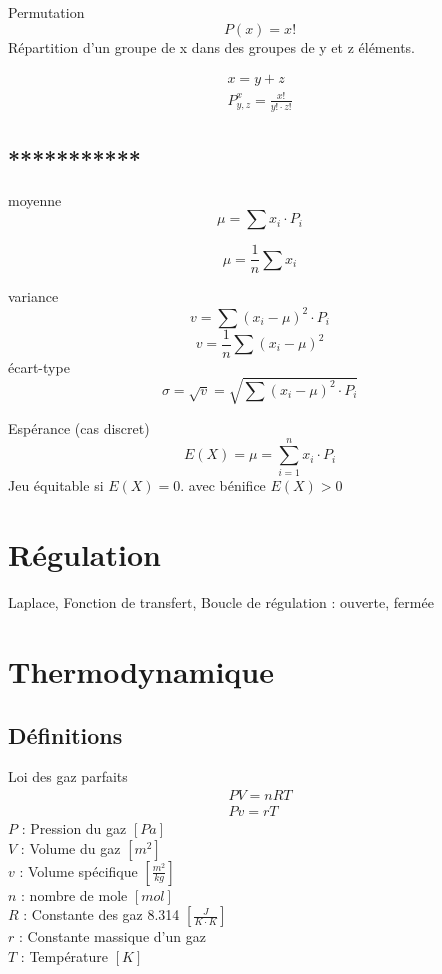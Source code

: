 	
	Permutation
	\begin{equation}
	P(x)=x!
	\end{equation}
	Répartition d'un groupe de x dans des groupes de y et z éléments.
	
	\begin{eqnarray}
	x=y+z\\
	P^x_{y,z}=\frac{x!}{y! \cdot z!}
	\end{eqnarray}
	\subsection{***********}
	
	moyenne
	\begin{equation}
	\mu=\sum x_i \cdot P_i
	\end{equation}
	
	\begin{equation}
	\mu = \frac{1}{n}\sum x_i
	\end{equation}
	
	variance
	\begin{equation}
	v=\sum (x_i-\mu)^2\cdot P_i
	\end{equation}
	\begin{equation}
	v=\frac{1}{n} \sum (x_i-\mu)^2
	\end{equation}
	écart-type
	\begin{equation}
	\sigma=\sqrt{v}=\sqrt{\sum (x_i-\mu)^2\cdot P_i}
	\end{equation}
	
	Espérance (cas discret)
	\begin{equation}
	E(X)=\mu=\sum_{i=1}^{n}x_i\cdot P_i
	\end{equation}
	Jeu équitable si $E(X)=0$. avec bénifice $E(X)>0$
	
	\newpage
	\section{Régulation}
	
	Laplace, Fonction de transfert, Boucle de régulation : ouverte, fermée
	
	\newpage
	\section{Thermodynamique}
	\subsection{Définitions}
	Loi des gaz parfaits
	\begin{eqnarray}
	PV=nRT\\
	Pv=rT
	\end{eqnarray}
	$P$ : Pression du gaz $[Pa]$\\
	$V$ : Volume du gaz $[m^2]$\\
	$v$ : Volume spécifique $[\frac{m^2}{kg}]$\\
	$n$ : nombre de mole $[mol]$\\
	$R$ : Constante des gaz 8.314 $[\frac{J}{K \cdot K}]$\\
	$r$ : Constante massique d'un gaz \\
	$T$ : Température $[K]$\\
	
